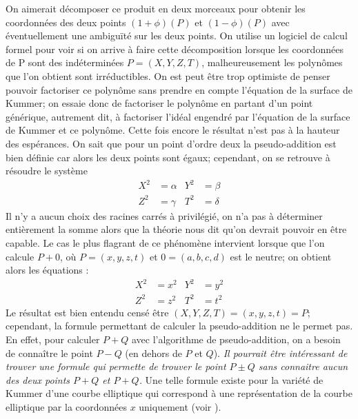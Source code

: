\documentclass[a4paper]{article}
\theoremstyle{definition}
\theoremstyle{remark}
\numberwithin{equation}{section}
\begin{document}
On aimerait décomposer ce produit en deux morceaux pour obtenir les coordonnées des deux points $(1 + \phi)(P)$ et $(1 - \phi)(P)$ avec éventuellement une ambiguïté sur les deux points. On utilise un logiciel de calcul formel pour voir si on arrive à faire cette décomposition lorsque les coordonnées de P sont des indéterminées $P=(X,Y,Z,T)$, malheureusement les polynômes que l'on obtient sont irréductibles. On est peut être trop optimiste de penser pouvoir factoriser ce polynôme sans prendre en compte l'équation de la surface de Kummer; on essaie donc de factoriser le polynôme en partant d'un point générique, autrement dit, à factoriser l'idéal engendré par l'équation de la surface de Kummer et ce polynôme. Cette fois encore le résultat n'est pas à la hauteur des espérances.
On sait que pour un point d'ordre deux la pseudo-addition est bien définie car alors les deux points sont égaux; cependant, on se retrouve à résoudre le système
\begin{align*}
X^2 &= \alpha  &Y^2 &= \beta \\
Z^2 &= \gamma  &T^2 &= \delta
\end{align*}
Il n'y a aucun choix des racines carrés à privilégié, on n'a pas à déterminer entièrement la somme alors que la théorie nous dit qu'on devrait pouvoir en être capable. Le cas le plus flagrant de ce phénomène intervient lorsque que l'on calcule $P+0$, où $P=(x,y,z,t)$ et $0=(a,b,c,d)$ est le neutre; on obtient alors les équations :
\begin{align*}
X^2 &= x^2  &Y^2 &= y^2 \\
Z^2 &= z^2  &T^2 &= t^2
\end{align*}
Le résultat est bien entendu censé être $(X,Y,Z,T)=(x,y,z,t)=P$; cependant, la formule permettant de calculer la pseudo-addition ne le permet pas. En effet, pour calculer $P+Q$ avec l'algorithme de pseudo-addition, on a besoin de connaître le point $P-Q$ (en dehors de $P$ et $Q$).
\emph{Il pourrait être intéressant de trouver une formule qui permette de trouver le point $P \pm Q$ sans connaitre aucun des deux points $P+Q$ et $P+Q$.}
Une telle formule existe pour la variété de Kummer d'une courbe elliptique qui correspond à une représentation de la courbe elliptique par la coordonnées $x$ uniquement (voir \citet{montgomery}).
\end{document}
